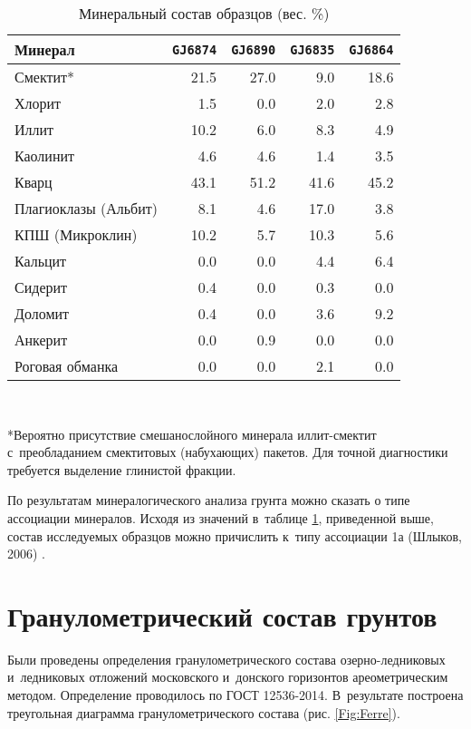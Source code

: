 \begin{table}[]
    \centering
    \small
    \caption{Минеральный состав образцов (вес. \%)} \label{tab:mineral}
    \begin{tabular}{@{}lrrrr@{}}
    \toprule
    Минерал & \texttt{GJ6874} &	\texttt{GJ6890} & \texttt{GJ6835} & \texttt{GJ6864}  \\ \midrule
    Смектит*	& 21.5	& 27.0	& 9.0	& 18.6 \\
    Хлорит	& 1.5	& 0.0	& 2.0	& 2.8 \\
    Иллит	& 10.2	& 6.0	& 8.3	& 4.9 \\
    Каолинит	& 4.6	& 4.6	& 1.4	& 3.5 \\
    Кварц	& 43.1	& 51.2	& 41.6	& 45.2 \\
    Плагиоклазы (Альбит)	& 8.1	& 4.6	& 17.0	& 3.8 \\
    КПШ (Микроклин)	& 10.2	& 5.7	& 10.3	& 5.6 \\
    Кальцит	& 0.0	& 0.0	& 4.4	& 6.4 \\
    Сидерит	& 0.4	& 0.0	& 0.3	& 0.0 \\
    Доломит	& 0.4	& 0.0	& 3.6	& 9.2 \\
    Анкерит	& 0.0	& 0.9	& 0.0	& 0.0 \\
    Роговая обманка	& 0.0	& 0.0	& 2.1	& 0.0 \\ \bottomrule
    \end{tabular}
    \\ 
    \raggedright 
    *Вероятно присутствие смешанослойного минерала иллит-смектит с~преобладанием смектитовых (набухающих) пакетов. Для точной диагностики требуется выделение глинистой фракции.
\end{table}
	
По результатам минералогического анализа грунта можно сказать о типе ассоциации минералов. 
Исходя из значений в~таблице \ref{tab:mineral}, приведенной выше, состав исследуемых образцов можно причислить к~типу ассоциации 1а (Шлыков, 2006) \cite{Sh_2006}.


\section{Гранулометрический состав грунтов}

Были проведены определения гранулометрического состава озерно-ледниковых и~ледниковых отложений московского и~донского горизонтов ареометрическим методом. Определение проводилось по ГОСТ 12536-2014. В~результате построена треугольная диаграмма гранулометрического состава (рис. \ref{Fig:Ferre}).


